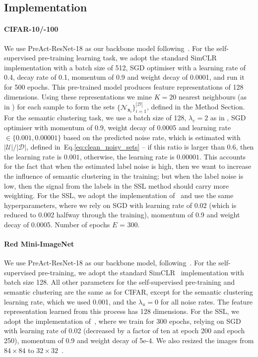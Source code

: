 \documentclass[review]{elsarticle}
\theoremstyle{plain}
\begin{document}
\subsection{Implementation}
\label{sec:implementation}




\paragraph{CIFAR-10/-100}
We use PreAct-ResNet-18 
as our backbone model following~\citep{li2020dividemix}. For the self-supervised pre-training learning task, we adopt the standard SimCLR~\citep{SimCLR} implementation with a batch size of 512, SGD optimiser with a learning rate of 0.4, decay rate of 0.1, momentum of 0.9 and weight decay of 0.0001, and run it for 500 epochs.  This pre-trained model produces feature representations of 128 dimensions. Using these representations we mine $K = 20$ nearest neighbours (as in \citep{SCAN}) for each sample to form the sets $\{ \mathcal{N}_{\mathbf{x}_{i}}\}_{i=1}^{|\mathcal{D}|}$, defined in the Method Section. 
For the semantic clustering task, we use a batch size of 128, $\lambda_e = 2$ as in \citep{SCAN}, SGD optimiser with momentum of 0.9, weight decay of 0.0005 and learning rate $\in \{0.001, 0.00001\}$ based on the predicted noise rate, which is estimated with $|\mathcal{U}|/|\mathcal{D}|$, defined in~Eq.\ref{eq:clean_noisy_sets} -- if this ratio is larger than $0.6$, then the learning rate is $0.001$, otherwise, the learning rate is $0.00001$.  This accounts for the fact that when the estimated label noise is high, then we want to increase the influence of semantic clustering in the training; but when the label noise is low, then the signal from the labels in the SSL method should carry more weighting. For the SSL, we adopt the implementation of~\citep{li2020dividemix} and use the same hyperparameters, where we rely on SGD with learning rate of 0.02 (which is reduced to 0.002 halfway through the training), momentum of 0.9 and weight decay of 0.0005. Number of epochs $E$ = 300. 

\paragraph{Red Mini-ImageNet} We use PreAct-ResNet-18 as our backbone model, following~\citep{FaMUS}. For the self-supervised pre-training, we adopt the standard SimCLR~\citep{SimCLR} implementation with batch size 128. All other parameters for the self-supervised pre-training and semantic clustering are the same as for CIFAR, except for the semantic clustering learning rate, which we used 0.001, and the $\lambda_u=0$ for all noise rates. The feature representation learned from this process has 128 dimensions. For the SSL, we adopt the implementation of~\citep{FaMUS}, where we train for 300 epochs,  relying on SGD with learning rate of 0.02 (decreased by a factor of ten at epoch 200 and epoch 250), momentum of 0.9 and weight decay of 5e-4. We also resized the images from $84\times84$ to $32\times32$~\citep{FaMUS}.
\end{document}
